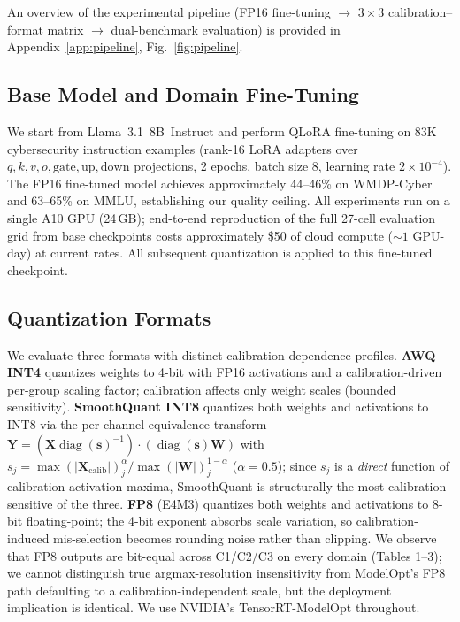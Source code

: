 \documentclass[11pt]{article}
\newcommand{\wmdp}{WMDP-Cyber}
\newcommand{\llama}{Llama~3.1~8B~Instruct}
\begin{document}
An overview of the experimental pipeline (FP16 fine-tuning $\to$
$3 \times 3$ calibration--format matrix $\to$ dual-benchmark
evaluation) is provided in Appendix~\ref{app:pipeline},
Fig.~\ref{fig:pipeline}.

\subsection{Base Model and Domain Fine-Tuning}
\label{sec:base}

We start from \llama{} \citep{meta2024llama3} and perform QLoRA
fine-tuning on 83K cybersecurity instruction examples (rank-16 LoRA
adapters over $q,k,v,o,\text{gate},\text{up},\text{down}$ projections,
2 epochs, batch size 8, learning rate $2\times10^{-4}$).  The FP16
fine-tuned model achieves approximately 44--46\% on \wmdp{} and
63--65\% on MMLU, establishing our quality ceiling.  All experiments
run on a single A10 GPU (24\,GB); end-to-end reproduction of the
full 27-cell evaluation grid from base checkpoints costs
approximately \$50 of cloud compute (${\sim}1$ GPU-day) at current
rates.  All subsequent quantization is applied to this fine-tuned
checkpoint.

\subsection{Quantization Formats}
\label{sec:formats}

\begin{sloppypar}
We evaluate three formats with distinct calibration-dependence
profiles.  \textbf{AWQ INT4} \citep{lin2023awq} quantizes weights to
4-bit with FP16 activations and a calibration-driven per-group
scaling factor; calibration affects only weight scales (bounded
sensitivity).  \textbf{SmoothQuant INT8} \citep{xiao2023smoothquant}
quantizes both weights and activations to INT8 via the per-channel
equivalence transform $\mathbf{Y} =
(\mathbf{X}\operatorname{diag}(\mathbf{s})^{-1}) \cdot
(\operatorname{diag}(\mathbf{s})\mathbf{W})$ with
$s_j = \max(|\mathbf{X}_{\mathrm{calib}}|)_j^{\alpha} /
\max(|\mathbf{W}|)_j^{1-\alpha}$ ($\alpha=0.5$); since $s_j$ is a
\emph{direct} function of calibration activation maxima,
SmoothQuant is structurally the most calibration-sensitive of the
three.  \textbf{FP8} (E4M3) \citep{micikevicius2022fp8} quantizes
both weights and activations to 8-bit floating-point; the 4-bit
exponent absorbs scale variation, so calibration-induced
mis-selection becomes rounding noise rather than clipping.  We
observe that FP8 outputs are bit-equal across C1/C2/C3 on every
domain (Tables 1--3); we cannot distinguish true argmax-resolution
insensitivity from ModelOpt's FP8 path defaulting to a
calibration-independent scale, but the deployment implication is
identical.  We use NVIDIA's TensorRT-ModelOpt throughout.
\end{sloppypar}
\end{document}
